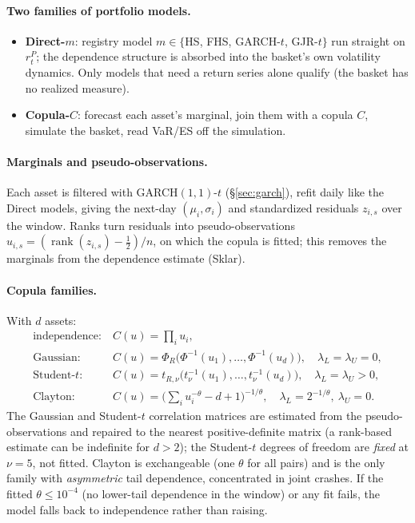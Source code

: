 \documentclass[11pt,a4paper]{article}
\begin{document}
\paragraph{Two families of portfolio models.}
\begin{itemize}[nosep]
\item \textbf{Direct-$m$}: registry model $m\in\{$HS, FHS, GARCH-$t$,
      GJR-$t\}$ run straight on $r^P_t$; the dependence structure is absorbed
      into the basket's own volatility dynamics. Only models that need a return
      series alone qualify (the basket has no realized measure).
\item \textbf{Copula-$C$}: forecast each asset's marginal, join them with a
      copula $C$, simulate the basket, read VaR/ES off the simulation.
\end{itemize}

\paragraph{Marginals and pseudo-observations.} Each asset is filtered with
GARCH$(1,1)$-$t$ (\S\ref{sec:garch}), refit daily like the Direct models, giving
the next-day $(\mu_{i},\sigma_{i})$ and standardized residuals $z_{i,s}$ over
the window. Ranks turn residuals into pseudo-observations
$u_{i,s}=(\operatorname{rank}(z_{i,s})-\tfrac12)/n$, on which the copula is
fitted; this removes the marginals from the dependence estimate (Sklar).

\paragraph{Copula families.} With $d$ assets:
\begin{align}
  \text{independence:}\ & C(u)=\textstyle\prod_i u_i, \\
  \text{Gaussian:}\ & C(u)=\Phi_R\big(\Phi^{-1}(u_1),\dots,\Phi^{-1}(u_d)\big),
      \quad \lambda_L=\lambda_U=0, \\
  \text{Student-}t:\ & C(u)=t_{R,\nu}\big(t_\nu^{-1}(u_1),\dots,t_\nu^{-1}(u_d)\big),
      \quad \lambda_L=\lambda_U>0, \\
  \text{Clayton:}\ & C(u)=\Big(\textstyle\sum_i u_i^{-\theta}-d+1\Big)^{-1/\theta},
      \quad \lambda_L=2^{-1/\theta},\ \lambda_U=0 .
\end{align}
The Gaussian and Student-$t$ correlation matrices are estimated from the
pseudo-observations and repaired to the nearest positive-definite matrix (a
rank-based estimate can be indefinite for $d>2$); the Student-$t$ degrees of
freedom are \emph{fixed} at $\nu=5$, not fitted. Clayton is exchangeable (one
$\theta$ for all pairs) and is the only family with \emph{asymmetric} tail
dependence, concentrated in joint crashes. If the fitted $\theta\le10^{-4}$ (no
lower-tail dependence in the window) or any fit fails, the model falls back to
independence rather than raising.
\end{document}
